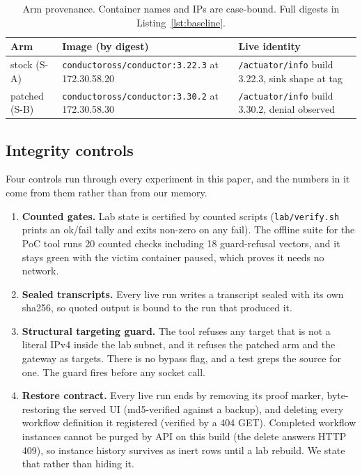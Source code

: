 \documentclass[journal]{IEEEtran}
\begin{document}
\begin{table}[t]
\centering
\caption{Arm provenance. Container names and IPs are case-bound. Full digests
in Listing~\ref{lst:baseline}.}
\label{tab:prov}
\footnotesize
\begin{tabular}{@{}p{1.45cm}p{3.1cm}p{3.1cm}@{}}
\toprule
Arm & Image (by digest) & Live identity \\
\midrule
stock (S-A) & \texttt{conductoross/\allowbreak conductor:3.22.3} at
172.30.58.20 & \texttt{/actuator/info} build 3.22.3, sink shape at tag \\
patched (S-B) & \texttt{conductoross/\allowbreak conductor:3.30.2} at
172.30.58.30 & \texttt{/actuator/info} build 3.30.2, denial observed \\
\bottomrule
\end{tabular}
\end{table}

\subsection{Integrity controls}

Four controls run through every experiment in this paper, and the numbers in
it come from them rather than from our memory.
\begin{enumerate}
\item \textbf{Counted gates.} Lab state is certified by counted scripts
(\texttt{lab/verify.sh} prints an ok/fail tally and exits non-zero on any
fail). The offline suite for the PoC tool runs 20 counted checks including 18
guard-refusal vectors, and it stays green with the victim container paused,
which proves it needs no network.
\item \textbf{Sealed transcripts.} Every live run writes a transcript sealed
with its own sha256, so quoted output is bound to the run that produced it.
\item \textbf{Structural targeting guard.} The tool refuses any target that is
not a literal IPv4 inside the lab subnet, and it refuses the patched arm and
the gateway as targets. There is no bypass flag, and a test greps the source
for one. The guard fires before any socket call.
\item \textbf{Restore contract.} Every live run ends by removing its proof
marker, byte-restoring the served UI (md5-verified against a backup), and
deleting every workflow definition it registered (verified by a 404 GET).
Completed workflow instances cannot be purged by API on this build (the delete
answers HTTP 409), so instance history survives as inert rows until a lab
rebuild. We state that rather than hiding it.
\end{enumerate}
\end{document}
